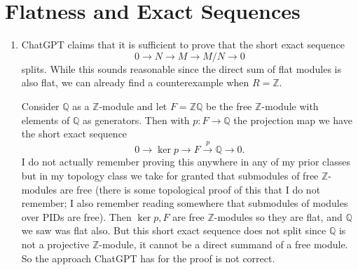 \documentclass[11pt]{article}
\begin{document}
\section{Flatness and Exact Sequences}
\begin{enumerate}[label=(\alph*)]
    \item ChatGPT claims that it is sufficient to prove that the short exact sequence \[0\to N\to M \to M/N\to 0\] splits. While this sounds reasonable since the direct sum of flat modules is also flat, we can already find a counterexample when $R= \mathbb{Z}$.
    
    Consider $\mathbb{Q}$ as a $\mathbb{Z}$-module and let $F = \mathbb{ZQ}$ be the free $\mathbb{Z}$-module with elements of $\mathbb{Q}$ as generators. Then with $p\colon F\to \mathbb{Q}$ the projection map we have the short exact sequence \[0\to \ker p\to F\xrightarrow{p}\mathbb{Q}\to 0.\] I do not actually remember proving this anywhere in any of my prior classes but in my topology class we take for granted that submodules of free $\mathbb{Z}$-modules are free (there is some topological proof of this that I do not remember; I also remember reading somewhere that submodules of modules over PIDs are free). Then $\ker p, F$ are free $\mathbb{Z}$-modules so they are flat, and $\mathbb{Q}$ we saw was flat also. But this short exact sequence does not split since $\mathbb{Q}$ is not a projective $\mathbb{Z}$-module, it cannot be a direct summand of a free module. So the approach ChatGPT has for the proof is not correct.


\end{enumerate}
\end{document}
